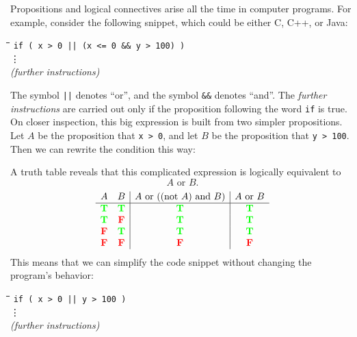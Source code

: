 Propositions and logical connectives arise all the time in computer
programs.  For example, consider the following snippet, which could be
either C, C++, or Java:
%
\begin{tabbing}
\hspace{1in} \= \quad\quad \= \quad\quad \= \quad\quad \= \kill
\> \texttt{if ( x > 0 || (x <= 0 \&\& y > 100) )} \\
\> \> \vdots\\
\> \textit{(further instructions)}
\end{tabbing}
%
The symbol \texttt{||} denotes ``or'', and the symbol \texttt{\&\&}
denotes ``and''.  The \textit{further instructions} are carried out
only if the proposition following the word \texttt{if} is true.  On
closer inspection, this big expression is built from two simpler
propositions.  Let $A$ be the proposition that \texttt{x > 0}, and let
$B$ be the proposition that \texttt{y > 100}.  Then we can rewrite the
condition this way:
%
%
A truth table reveals that this complicated expression is logically
equivalent to 
\begin{equation}\label{AOB}
A \text{ or } B.
\end{equation}
%
\[
\begin{array}{cc|c|c}
A & B &
    A \text{ or } ((\text{not } A) \text{ and } B) &
    A \text{ or } B \\ \hline
\textcolor{green}{\mathbf{T}} & \textcolor{green}{\mathbf{T}} & \textcolor{green}{\mathbf{T}} & \textcolor{green}{\mathbf{T}} \\
\textcolor{green}{\mathbf{T}} & \textcolor{red}{\mathbf{F}} & \textcolor{green}{\mathbf{T}} & \textcolor{green}{\mathbf{T}} \\
\textcolor{red}{\mathbf{F}} & \textcolor{green}{\mathbf{T}} & \textcolor{green}{\mathbf{T}} & \textcolor{green}{\mathbf{T}} \\
\textcolor{red}{\mathbf{F}} & \textcolor{red}{\mathbf{F}} & \textcolor{red}{\mathbf{F}} & \textcolor{red}{\mathbf{F}}
\end{array}
\]
%
This means that we can simplify the code snippet without changing the
program's behavior:
%
\begin{tabbing}
\hspace{1in} \= \quad\quad \= \quad\quad \= \quad\quad \= \kill
\> \texttt{if ( x > 0 || y > 100 )} \\
\> \> \vdots\\
\> \textit{(further instructions)}
\end{tabbing}

